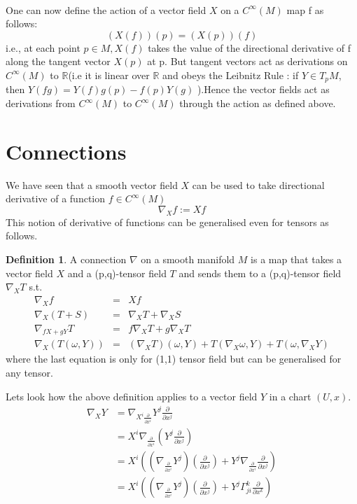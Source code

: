 \documentclass[a4paper]{report}
\theoremstyle{definition}
\newtheorem{definition}{Definition}[section]
\theoremstyle{remark}
\begin{document}
		\\ One can now define the action of a vector field $X$ on a $C^{\infty}(M)$ map f as follows:
		\begin{equation*}
			(X(f))(p) = (X(p))(f) 
		\end{equation*}	
		i.e., at each point $p \in M , X(f)$ takes the value of the directional derivative of f along the tangent vector $X(p)$ at p. But tangent vectors act as derivations on $C^{\infty}(M)$ to $\mathbb{R}$(i.e it is linear over $\mathbb{R}$ and obeys the Leibnitz Rule : if $Y \in T_pM$, then $Y(fg)=Y(f)g(p)-f(p)Y(g)$ ).Hence the vector fields act as derivations from $C^{\infty}(M)$ to $C^{\infty}(M)$ through the action as defined above.

	\section{Connections}
		We have seen that a smooth vector field $X$ can be used to take directional derivative of a function $f\in C^\infty(M)$
		\begin{equation*}
			\nabla_Xf := Xf
		\end{equation*} 
		This notion of derivative of functions can be generalised even for tensors as follows.
		\begin{definition}
			A connection $\nabla$ on a smooth manifold $M$ is a map that takes a vector field $X$ and a (p,q)-tensor field $T$ and sends them to a (p,q)-tensor field $\nabla_XT$ s.t.
			\begin{eqnarray*}
				\nabla_Xf &=& Xf  \\
				\nabla_X(T+S)&=&\nabla_XT + \nabla_XS \\ 
				\nabla_{fX+gY}T &=& f\nabla_XT + g\nabla_XT \\
				\nabla_X(T(\omega,Y)) &=& (\nabla_XT)(\omega,Y) + T(\nabla_X\omega,Y) + T(\omega,\nabla_XY)
			\end{eqnarray*}
			where the last equation is only for (1,1) tensor field but can be generalised for any tensor.
		\end{definition}
		Lets look how the above definition applies to a vector field $Y$ in a chart $(U,x)$.
		\begin{equation*}
			\begin{split}
				\nabla_XY &=\nabla_{X^i\tfrac{\partial}{\partial x^i}}Y^j\tfrac{\partial}{\partial x^j} \\
				&=X^i\nabla_{\tfrac{\partial}{\partial x^i}}(Y^j\tfrac{\partial}{\partial x^j}) \\
				&=X^i\left((\nabla_{\tfrac{\partial}{\partial x^i}}Y^j)(\tfrac{\partial}{\partial x^j}) + Y^j\nabla_{\tfrac{\partial}{\partial x^i}}\tfrac{\partial}{\partial x^j}\right) \\ 
				&=X^i\left((\nabla_{\tfrac{\partial}{\partial x^i}}Y^j)(\tfrac{\partial}{\partial x^j}) + Y^j\Gamma_{ji}^{k}\tfrac{\partial}{\partial x^k}\right)
			\end{split}
		\end{equation*}
\end{document}
